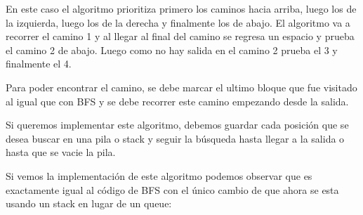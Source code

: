 \documentclass{article}
\begin{document}
En este caso el algoritmo prioritiza primero los caminos hacia arriba, luego los de la izquierda, luego los de la derecha y finalmente los de abajo. El algoritmo va a recorrer el camino 1 y al llegar al final del camino se regresa un espacio y prueba el camino 2 de abajo. Luego como no hay salida en el camino 2 prueba el 3 y finalmente el 4.

Para poder encontrar el camino, se debe marcar el ultimo bloque que fue visitado al igual que con BFS y se debe recorrer este camino empezando desde la salida.

Si queremos implementar este algoritmo, debemos guardar cada posición que se desea buscar en una pila o stack y seguir la búsqueda hasta llegar a la salida o hasta que se vacie la pila.

Si vemos la implementación de este algoritmo podemos observar que es exactamente igual al código de BFS con el único cambio de que ahora se esta usando un stack en lugar de un queue:
\end{document}
